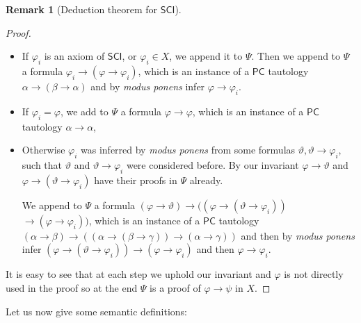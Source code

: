 \documentclass{article}
\theoremstyle{definition}
\theoremstyle{definition}
\theoremstyle{definition}
\newtheorem{remark}{Remark}[section]
\theoremstyle{definition}
\theoremstyle{definition}
\newcommand*{\ra}{\rightarrow}
\newcommand{\SCI}{$\mathsf{SCI}$\xspace}
\newcommand{\PC}{$\mathsf{PC}$\xspace}
\begin{document}
\begin{remark}[Deduction theorem for \SCI]
\begin{proof}
        \begin{itemize}
            \item If $\varphi_i$ is an axiom of \SCI, or $\varphi_i \in X$, we append it to
                  $\Psi$. Then we append to $\Psi$ a formula $\varphi_i \ra (\varphi \ra
                      \varphi_i)$, which is an instance of a \PC tautology $\alpha \ra (\beta \ra
                      \alpha)$ and by \emph{modus ponens} infer $\varphi \ra \varphi_i$.
            \item If $\varphi_i = \varphi$, we add to $\Psi$ a formula $\varphi \ra \varphi$,
                  which is an instance of a \PC tautology $\alpha \ra \alpha$,
            \item Otherwise $\varphi_i$ was inferred by \emph{modus ponens} from some formulas
                  $\vartheta, \vartheta \ra \varphi_i$, such that $\vartheta$ and $\vartheta \ra
                      \varphi_i$ were considered before. By our invariant $\varphi \ra \vartheta$ and
                  $\varphi \ra (\vartheta \ra \varphi_i)$ have their proofs in $\Psi$ already.

                  We append to $\Psi$ a formula $(\varphi \ra \vartheta) \ra( (\varphi \ra
                      (\vartheta \ra \varphi_i))$ $ \ra (\varphi \ra \varphi_i) )$, which is an
                  instance of a \PC tautology $(\alpha \ra \beta) \ra ( (\alpha \ra (\beta \ra
                      \gamma)) \ra (\alpha \ra \gamma) )$ and then by \emph{modus ponens} infer
                  $(\varphi \ra (\vartheta \ra \varphi_i)) \ra (\varphi \ra \varphi_i)$ and then
                  $\varphi \ra \varphi_i$.
        \end{itemize}

        It is easy to see that at each step we uphold our invariant and $\varphi$ is
        not directly used in the proof so at the end $\Psi$ is a proof of $\varphi \ra
            \psi$ in $X$.

    \end{proof}
\end{remark}
%
Let us now give some semantic definitions:
\end{document}
